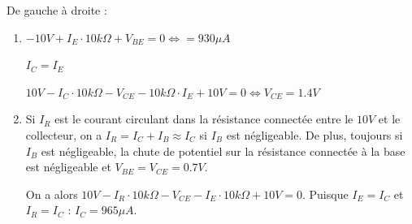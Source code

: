 \documentclass{../../template/tp}
\author{GEI}
\begin{document}




{
De gauche à droite :
\begin{enumerate}
    \item $-10 V + I_E \cdot 10k\Omega + V_{BE} = 0 \Leftrightarrow = 930 \mu A$

    $I_C = I_E$

    $ 10 V - I_C \cdot 10k\Omega - V_{CE} - 10k\Omega \cdot I_E + 10V = 0 \Leftrightarrow V_{CE} = 1.4 V$

    \item Si $I_R$ est le courant circulant dans la résistance connectée entre le $10 V$ et le collecteur, on a $I_R = I_C + I_B \approx I_C$ si $I_B$ est négligeable.
    De plus, toujours si $I_B$ est négligeable, la chute de potentiel sur la résistance connectée à la base est négligeable et $V_{BE} = V_{CE} = 0.7 V$.

    On a alors $10 V - I_R \cdot 10 k\Omega - V_{CE} - I_E \cdot 10 k\Omega + 10 V = 0$. Puisque $I_E = I_C$ et $I_R = I_C$ : $I_C = 965 \mu A$.
\end{enumerate}
}
\end{document}
